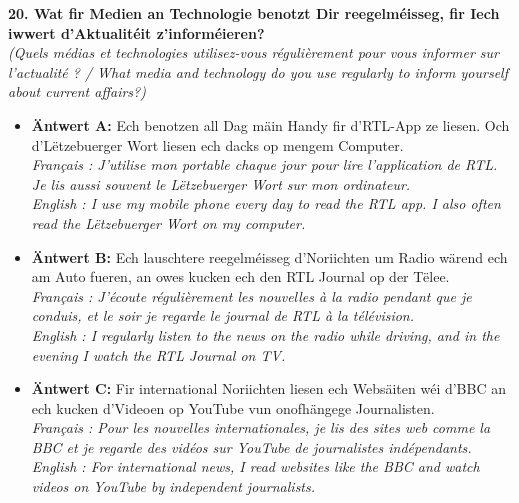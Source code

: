 \noindent\textbf{20. Wat fir Medien an Technologie benotzt Dir reegelméisseg, fir Iech iwwert d’Aktualitéit z’informéieren?}\\
\textit{(Quels médias et technologies utilisez-vous régulièrement pour vous informer sur l'actualité ? / What media and technology do you use regularly to inform yourself about current affairs?)}
\begin{itemize}
    \item \textbf{Äntwert A:} Ech benotzen all Dag mäin Handy fir d'RTL-App ze liesen. Och d'Lëtzebuerger Wort liesen ech dacks op mengem Computer.\\
    \textit{Français : J'utilise mon portable chaque jour pour lire l'application de RTL. Je lis aussi souvent le Lëtzebuerger Wort sur mon ordinateur.}\\
    \textit{English : I use my mobile phone every day to read the RTL app. I also often read the Lëtzebuerger Wort on my computer.}
    \item \textbf{Äntwert B:} Ech lauschtere reegelméisseg d'Noriichten um Radio wärend ech am Auto fueren, an owes kucken ech den RTL Journal op der Tëlee.\\
    \textit{Français : J'écoute régulièrement les nouvelles à la radio pendant que je conduis, et le soir je regarde le journal de RTL à la télévision.}\\
    \textit{English : I regularly listen to the news on the radio while driving, and in the evening I watch the RTL Journal on TV.}
    \item \textbf{Äntwert C:} Fir international Noriichten liesen ech Websäiten wéi d'BBC an ech kucken d'Videoen op YouTube vun onofhängege Journalisten.\\
    \textit{Français : Pour les nouvelles internationales, je lis des sites web comme la BBC et je regarde des vidéos sur YouTube de journalistes indépendants.}\\
    \textit{English : For international news, I read websites like the BBC and watch videos on YouTube by independent journalists.}
\end{itemize}
\vspace{0.5em}

